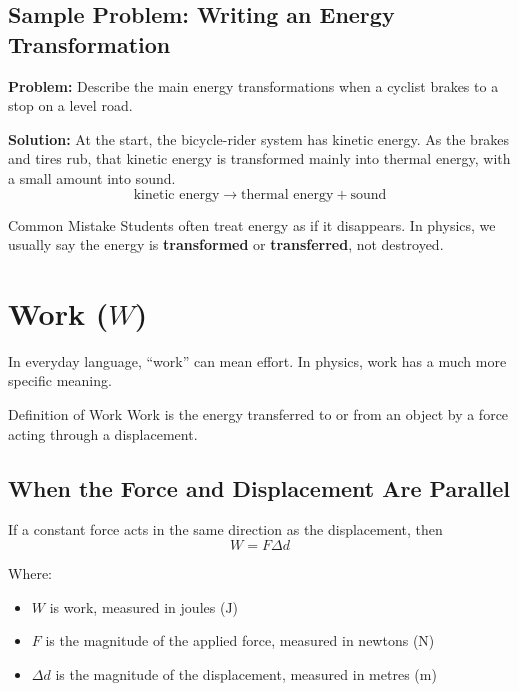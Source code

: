 \subsection*{Sample Problem: Writing an Energy Transformation}
\textbf{Problem:} Describe the main energy transformations when a cyclist brakes to a stop on a level road.

\textbf{Solution:} At the start, the bicycle-rider system has kinetic energy. As the brakes and tires rub, that kinetic energy is transformed mainly into thermal energy, with a small amount into sound.
\begin{equation*}
    \text{kinetic energy} \rightarrow \text{thermal energy} + \text{sound}
\end{equation*}

\begin{pitfall}{Common Mistake}
Students often treat energy as if it disappears. In physics, we usually say the energy is \textbf{transformed} or \textbf{transferred}, not destroyed.
\end{pitfall}

\section{Work ($W$)}
In everyday language, ``work'' can mean effort. In physics, work has a much more specific meaning.

\begin{keyidea}{Definition of Work}
Work is the energy transferred to or from an object by a force acting through a displacement.
\end{keyidea}

\subsection{When the Force and Displacement Are Parallel}
If a constant force acts in the same direction as the displacement, then
\begin{equation}
    W = F \Delta d
\end{equation}

Where:
\begin{itemize}
    \item $W$ is work, measured in joules ($\text{J}$)
    \item $F$ is the magnitude of the applied force, measured in newtons ($\text{N}$)
    \item $\Delta d$ is the magnitude of the displacement, measured in metres ($\text{m}$)
\end{itemize}

